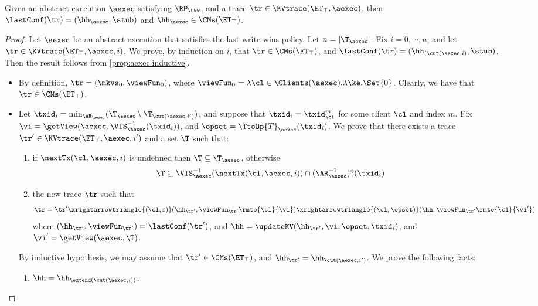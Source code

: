 \begin{proposition}
\label{prop:aexec2kvtrace}
Given an abstract execution $\aexec$ satisfying $\RP_{\LWW}$, 
and a trace $\tr \in \KVtrace(\ET_{\top}, \aexec)$,
then $\lastConf(\tr) = (\hh_{\aexec}, \stub)$ and $\hh_{\aexec} \in \CMs(\ET_{\top})$. 
\end{proposition}
\begin{proof}
Let $\aexec$ be an abstract execution that satisfies the last write wins policy. 
Let $n = \lvert \T_{\aexec} \rvert$. Fix $i =0,\cdots, n$, 
and let $\tr \in \KVtrace(\ET_{\top}, \aexec, i)$. We prove, by 
induction on $i$, that $\tr \in \CMs(\ET_{\top})$, and 
$\lastConf(\tr) = (\hh_{(\cut(\aexec, i)}, \stub)$. 
Then the result follows from  \cref{prop:aexec.inductive}.

\begin{itemize}
\item {} By definition, $\tr = (\mkvs_{0}, \viewFun_{0})$, 
where $\viewFun_{0} = \lambda \cl \in \Clients(\aexec). \lambda \ke.\Set{0}$. 
Clearly, we have that $\tr \in \CMs(\ET_{\top})$. 
\item {} Let $\txid_{i} = \min_{\AR_{\aexec}}(\T_{\aexec} \setminus \T_{\cut(\aexec, i')})$, 
and suppose that $\txid_{i} = \txid_{\cl}^{m}$ for some client $\cl$ and index $m$. 
Fix $\vi = \getView(\aexec, \VIS_{\aexec}^{-1}(\txid_{i}))$, and  $\opset = \TtoOp{T}_{\aexec}(\txid_{i})$.
We prove that there exists a trace $\tr' \in \KVtrace(\ET_{\top}, \aexec, i')$ and a set 
$\T$ such that: 
\begin{enumerate}
\item if $\nextTx(\cl, \aexec, i)$ is undefined then $\T \subseteq \T_{\aexec}$, otherwise 
\[
    \T \subseteq \VIS^{-1}_{\aexec}(\nextTx(\cl, \aexec, i)) \cap (\AR_{\aexec}^{-1})?(\txid_{i})
\]
\item the new trace \( \tr \) such that
\[
\tr = \tr' \xrightarrowtriangle{(\cl, \varepsilon)} (\hh_{\tr'}, \viewFun_{\tr'}\rmto{\cl}{\vi}) \xrightarrowtriangle{(\cl, \opset)} 
(\hh,  \viewFun_{\tr'}\rmto{\cl}{\vi'})
\]
where $(\hh_{\tr'}, \viewFun_{\tr'}) = \lastConf(\tr')$, and $\hh = \updateKV(\hh_{\tr'}, \vi, \opset, \txid_{i})$, 
and $\vi' = \getView(\aexec, \T)$.
\end{enumerate}
By inductive hypothesis, we may assume that $\tr' \in \CMs(\ET_{\top})$, and $\hh_{\tr'} = \hh_{\cut(\aexec, i')}$. 
We prove the following facts: 
\begin{enumerate}
\item $\hh = \hh_{\extend(\cut(\aexec, i))}$. 

\end{enumerate}
\end{itemize}
\end{proof}
